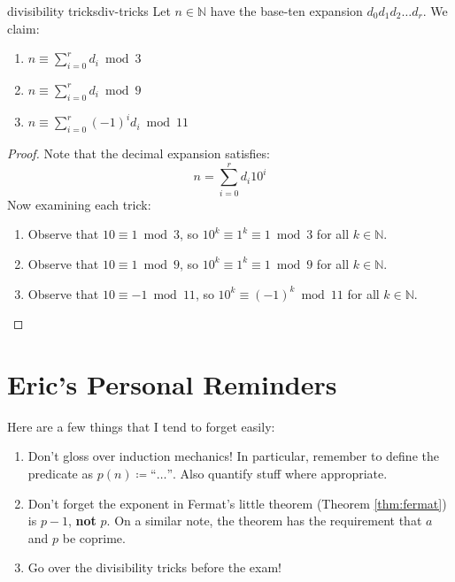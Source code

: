 \documentclass{article}
\theoremstyle{definition}
\begin{document}
\begin{theorem}{divisibility tricks}{div-tricks}
  Let $n \in \mathbb{N}$ have the base-ten expansion $d_0d_1d_2 \dots d_r$. We
  claim:
  \begin{enumerate}
    \item $n \equiv \sum _{i=0} ^{r} d_i \bmod 3$
    \item $n \equiv \sum _{i=0} ^{r} d_i \bmod 9$
    \item $n \equiv \sum _{i=0} ^{r} (-1)^{i} d_i \bmod 11$
  \end{enumerate}
\end{theorem}
\begin{proof}
  Note that the decimal expansion satisfies:
  \begin{equation*}
    n = \sum _{i=0} ^r d_i 10^i
  \end{equation*}
  Now examining each trick:
  \begin{enumerate}
    \item Observe that $10 \equiv 1 \bmod 3$, so $10^k \equiv 1^k \equiv 1
      \bmod 3$ for all $k \in \mathbb{N}$.
    \item Observe that $10 \equiv 1 \bmod 9$, so $10^k \equiv 1^k \equiv 1
      \bmod 9$ for all $k \in \mathbb{N}$.
    \item Observe that $10 \equiv -1 \bmod 11$, so $10^k \equiv (-1)^k \bmod 11$
      for all $k \in \mathbb{N}$.
  \end{enumerate}
\end{proof}

\section{Eric's Personal Reminders}
Here are a few things that I tend to forget easily:
\begin{enumerate}
  \item Don't gloss over induction mechanics! In particular, remember to define
    the predicate as $p(n) \coloneqq \textrm{``$\dots$''}$. Also quantify stuff
    where appropriate.
  \item Don't forget the exponent in Fermat's little theorem (Theorem
    \ref{thm:fermat}) is $p-1$, \textbf{not} $p$. On a similar note, the theorem
    has the requirement that $a$ and $p$ be coprime.
  \item Go over the divisibility tricks before the exam!
\end{enumerate}
\end{document}
